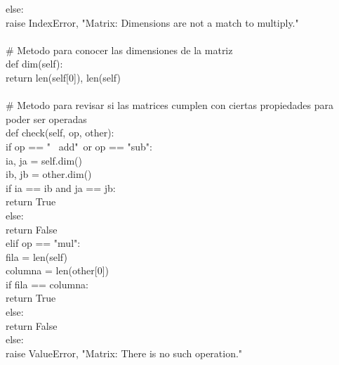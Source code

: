 \documentclass[10pt,letterpaper]{article}
\newenvironment{Code}
{
\begin{lrbox}{\selvestebox}%
\begin{minipage}{\dimexpr\columnwidth-2\fboxsep\relax}
\fontfamily{\ttdefault}\selectfont
}
{\end{minipage}\end{lrbox}%
\begin{center}
\colorbox{light-gray}{\usebox{\selvestebox}}
\end{center}
}
\begin{document}
\begin{scriptsize}
\begin{Code}
\hspace*{17mm} else:\\
\hspace*{23mm} raise IndexError, "Matrix: Dimensions are not a match to multiply."\\
\\
\hspace*{5mm} \# Metodo para conocer las dimensiones de la matriz\\
\hspace*{5mm} def dim(self):\\
\hspace*{11mm} return len(self[0]), len(self)\\
\\
\hspace*{5mm} \# Metodo para revisar si las matrices cumplen con ciertas propiedades para poder ser operadas\\
\hspace*{5mm} def check(self, op, other):\\
\hspace*{11mm} if op == "\ \hspace*{-3mm} add"\ or op == "sub":\\
\hspace*{17mm} ia, ja = self.dim()\\
\hspace*{17mm} ib, jb = other.dim()\\
\hspace*{17mm} if ia == ib and ja == jb:\\
\hspace*{23mm} return True\\
\hspace*{17mm} else:\\
\hspace*{23mm} return False\\
\hspace*{11mm} elif op == "mul":\\
\hspace*{17mm} fila = len(self)\\
\hspace*{17mm} columna = len(other[0])\\
\hspace*{17mm} if fila == columna:\\
\hspace*{23mm} return True\\
\hspace*{17mm} else:\\
\hspace*{23mm} return False\\
\hspace*{11mm} else:\\
\hspace*{17mm} raise ValueError, "Matrix: There is no such operation."
\end{Code}
\end{scriptsize}
\end{document}
